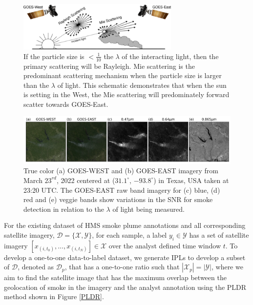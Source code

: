 \documentclass{article}
\begin{document}
\begin{figure}[!htb]
    \centering
    \includegraphics[width=8cm]{figures/mei_small.png}
    \caption{If the particle size is \(<\frac{1}{10}\) the \(\lambda\) of the interacting light, then the primary scattering will be Rayleigh. Mie scattering is the predominant scattering mechanism when the particle size is larger than the \(\lambda\) of light. This schematic demonstrates that when the sun is setting in the West, the Mie scattering will predominately forward scatter towards GOES-East.} \label{mei}
\end{figure}

\begin{figure}[!htb]
    \centering
    \includegraphics[width=\linewidth]{figures/GOES_WEST_EAST_B_R_V_small.png}
    \caption{True color (a) GOES-WEST and (b) GOES-EAST imagery from March \(23^{rd}\), 2022 centered at (\(31.1^{\circ}\), \(-93.8^{\circ}\)) in Texas, USA taken at 23:20 UTC. The GOES-EAST raw band imagery for (c) blue, (d) red and (e) veggie bands show variations in the SNR for smoke detection in relation to the \(\lambda\) of light being measured.}\label{WEST_EAST_bands}
\end{figure}

For the existing dataset of HMS smoke plume annotations and all corresponding satellite imagery, \(\mathcal{D} = \{\mathcal{X}, \mathcal{Y}\}\), for each sample, a label \(y_i \in \mathcal{Y}\) has a set of satellite imagery \([x_{(i,t_0)},...,x_{(i,t_N)}] \in \mathcal{X}\) over the analyst defined time window \(t\). To develop a one-to-one data-to-label dataset, we generate IPLs to develop a subset of \(\mathcal{D}\), denoted as \(\mathcal{D}_p\), that has a one-to-one ratio such that \(|\mathcal{X}_p| = |\mathcal{Y}|\), where we aim to find the satellite image that has the maximum overlap between the geolocation of smoke in the imagery and the analyst annotation using the PLDR method shown in Figure \ref{PLDR}.
\end{document}
